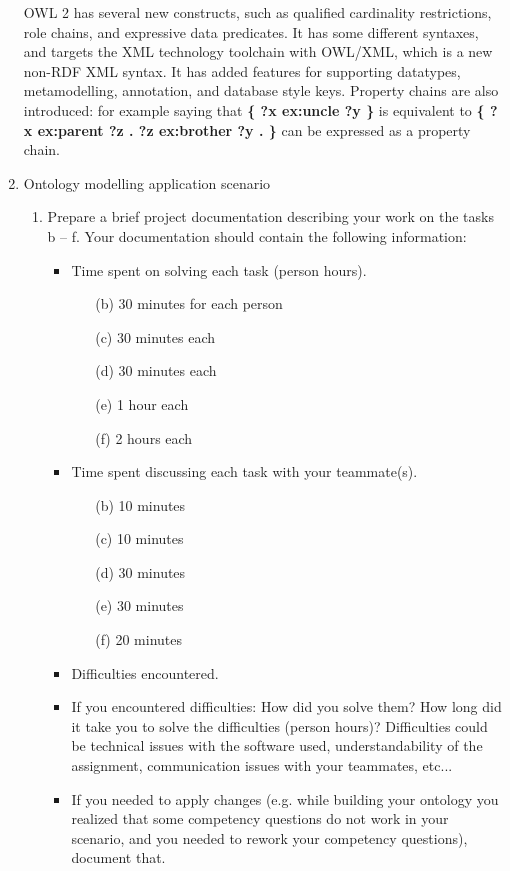 \documentclass[10pt,a4paper]{article}
\begin{document}
\begin{enumerate}
OWL 2 has several new constructs, such as qualified cardinality restrictions, role chains, and expressive data predicates. It has some different syntaxes, and targets the XML technology toolchain with OWL/XML, which is a new non-RDF XML syntax. It has added features for supporting datatypes, metamodelling, annotation, and database style keys. Property chains are also introduced: for example saying that \textbf{\{ ?x ex:uncle ?y \}} is equivalent to \textbf{\{ ?x ex:parent ?z . ?z ex:brother ?y . \}} can be expressed as a property chain.

\item Ontology modelling application scenario

\begin{enumerate}

\item Prepare a brief project documentation describing your work on the tasks b – f.
Your documentation should contain the following information:
	\begin{itemize}
		\item Time spent on solving each task (person hours).
			\begin{enumerate}
			\item[(b)] 30 minutes for each person
			\item[(c)] 30 minutes each
			\item[(d)] 30 minutes each
			\item[(e)] 1 hour each
			\item[(f)] 2 hours each
			\end{enumerate}
		\item Time spent discussing each task with your teammate(s).
			\begin{enumerate}
			\item[(b)] 10 minutes
			\item[(c)] 10 minutes
			\item[(d)] 30 minutes
			\item[(e)] 30 minutes
			\item[(f)] 20 minutes
			\end{enumerate}
		\item Difficulties encountered.
		\item If you encountered difficulties: How did you solve them? How long did it take you
to solve the difficulties (person hours)? Difficulties could be technical issues with
the software used, understandability of the assignment, communication issues
with your teammates, etc...
		\item If you needed to apply changes (e.g. while building your ontology you realized
that some competency questions do not work in your scenario, and you needed to
rework your competency questions), document that.
	\end{itemize}


\end{enumerate}
\end{enumerate}
\end{document}
